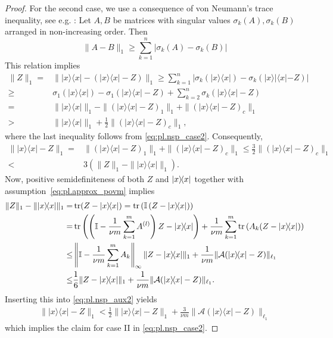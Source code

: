 \begin{proof}
  For the second case, we use a consequence of von Neumann's trace inequality, see e.g. \cite[Theorem~7.4.9.1]{Horn_1994_Topics}:
  Let $ A,  B$ be matrices with singular values $\sigma_k ( A),\sigma_k ( B)$ arranged in non-increasing order.
  Then
  \[
    \|  A -  B \|_1 \geq \sum_{k=1}^n | \sigma_k ( A) - \sigma_k ( B)|
  \]
  This relation implies
  \begin{align}
    \|  Z \|_1 =& \| |{x} \rangle \! \langle {x}| - (|{x} \rangle \! \langle {x}|- Z) \|_1
    \geq \sum_{k=1}^n \left| \sigma_k (| x \rangle \! \langle  x|) - \sigma_k (| x \rangle \! |\langle  x|-  Z ) \right| \\
    \geq & \sigma_1 (| x \rangle \langle  x|) - \sigma_1 \left( | x \rangle \! \langle  x| -  Z \right)+ \sum_{k=2}^n \sigma_k \left( | x \rangle \! \langle  x| -  Z\right) \\
    =&  \| | x \rangle \! \langle  x| \|_1  - \| (| x \rangle \! \langle  x| -  Z)_1 \|_1 + \|(| x \rangle \! \langle  x| - Z)_c \|_1 \\
    >& \| | x \rangle \! \langle  x| \|_1 + \frac{1}{2} \| (| x \rangle \! \langle  x|- Z)_c \|_1,
  \end{align}
  where the last inequality follows from \eqref{eq:pl.nsp_case2}. Consequently,
  \begin{align}
    \| | x \rangle \! \langle  x| -  Z \|_1
    =& \| (| x \rangle \! \langle  x| -  Z)_1 \|_1 + \| (| x \rangle \! \langle  x|- Z)_c \|_1
    \leq \frac{3}{2} \| (| x \rangle \! \langle  x|-  Z )_c \|_1 \nonumber \\
    < & 3 \left( \|  Z \|_1 - \| | x \rangle \! \langle  x| \|_1 \right). \label{eq:pl.nsp_aux2}
  \end{align}
  Now, positive semidefiniteness of both $ Z$ and $\ket{ x}\bra{ x}$ together with assumption~\eqref{eq:pl.approx_povm} implies
  \begin{align}
    \|  Z \|_1 - \| |{x} \rangle \! \langle {x}| \|_1
    =& \tr ( Z-|{x} \rangle \! \langle {x}|) =  \tr \left( \mathbb{I} \left(  Z-| {x} \rangle \! \langle x|\right) \right) \\
    =&  \tr \left( \left( \mathbb{I} - \frac{1}{\nu m} \sum_{k=1}^m A\ind{l} \right)  Z-|{x} \rangle \! \langle {x}| \right) + \frac{1}{\nu m} \sum_{k=1}^m \tr \left( A_k ( Z-|{x} \rangle \! \langle {x}|) \right) \\
    \leq &  \left\|\mathbb{I}- \frac{1}{ \nu m} \sum_{k=1}^m A_k \right\|_\infty \|  Z-|{x} \rangle \! \langle {x}| \|_1 + \frac{1}{\nu m} \| \mathcal{A}(|{x} \rangle \! \langle {x}|- Z) \|_{\ell_1} \\
    \leq &  \frac{1}{6 } \|  Z-|{x} \rangle \! \langle {x}| \|_1 + \frac{1}{\nu m} \| \mathcal{A}(|{x} \rangle \! \langle {x}|- Z) \|_{\ell_1}.
  \end{align}
  Inserting this into \eqref{eq:pl.nsp_aux2} yields
  \begin{align}
  \| | x \rangle \! \langle  x| -  Z \|_1 < \frac{1}{2} \| |{x} \rangle \! \langle {x}|- Z \|_1 +  \frac{3}{\nu m} \| \mathcal{A}(|{x} \rangle \! \langle {x}|- Z) \|_{\ell_1}
  \end{align}
  which implies the claim for case II in \eqref{eq:pl.nsp_case2}.
\end{proof}


